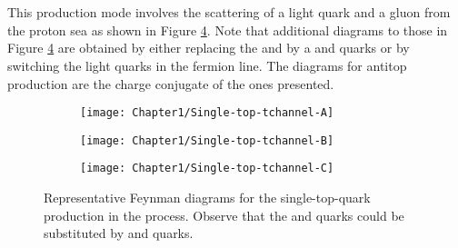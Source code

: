 \paragraph{\tchannel}\mbox{}\\
This production mode involves the scattering of a light quark and a gluon from the 
proton sea as shown in Figure \ref{fig:Chap1:top:singletop:tchannel}.
Note that additional diagrams to those in Figure \ref{fig:Chap1:top:singletop:tchannel} 
are obtained by either replacing the \Pup and \Pdown by a \Pcharm and \Pstrange
quarks or by switching the light quarks in the fermion line. The diagrams for antitop 
production are the charge conjugate of the ones presented. 

\begin{figure}
     \centering
     \begin{subfigure}[b]{0.3\textwidth}
         \centering
         \texttt{[image: Chapter1/Single-top-tchannel-A]}
         \caption{}
         \label{fig:Chap1:top:singletop:tchannel_A}
     \end{subfigure}
     \hfill
     \begin{subfigure}[b]{0.3\textwidth}
         \centering
         \texttt{[image: Chapter1/Single-top-tchannel-B]}
         \caption{}
         \label{fig:Chap1:top:singletop:tchannel_B}
     \end{subfigure}
     \hfill
     \begin{subfigure}[b]{0.3\textwidth}
         \centering
         \texttt{[image: Chapter1/Single-top-tchannel-C]}
         \caption{}
         \label{fig:Chap1:top:singletop:tchannel_C}
     \end{subfigure}
        \caption{Representative Feynman diagrams for the single-top-quark production in the \tchannel process. Observe that the \Pup and 
        \Pdown quarks could be substituted by \Pcharm and \Pstrange quarks.}
        \label{fig:Chap1:top:singletop:tchannel}
\end{figure}

